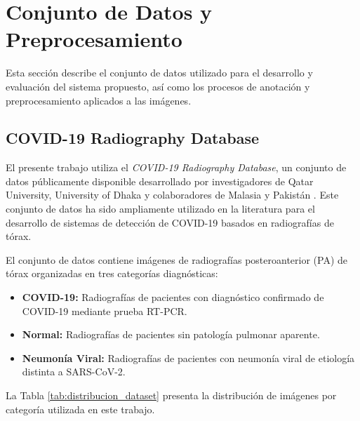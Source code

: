 
\section{Conjunto de Datos y Preprocesamiento}
\label{sec:dataset_preprocesamiento}

Esta sección describe el conjunto de datos utilizado para el desarrollo y evaluación del sistema propuesto, así como los procesos de anotación y preprocesamiento aplicados a las imágenes.

\subsection{COVID-19 Radiography Database}
\label{subsec:covid19_radiography_database}

El presente trabajo utiliza el \textit{COVID-19 Radiography Database}, un conjunto de datos públicamente disponible desarrollado por investigadores de Qatar University, University of Dhaka y colaboradores de Malasia y Pakistán \cite{chowdhury2020can, rahman2021exploring}. Este conjunto de datos ha sido ampliamente utilizado en la literatura para el desarrollo de sistemas de detección de COVID-19 basados en radiografías de tórax.

El conjunto de datos contiene imágenes de radiografías posteroanterior (PA) de tórax organizadas en tres categorías diagnósticas:

\begin{itemize}
    \item \textbf{COVID-19:} Radiografías de pacientes con diagnóstico confirmado de COVID-19 mediante prueba RT-PCR.
    \item \textbf{Normal:} Radiografías de pacientes sin patología pulmonar aparente.
    \item \textbf{Neumonía Viral:} Radiografías de pacientes con neumonía viral de etiología distinta a SARS-CoV-2.
\end{itemize}

La Tabla \ref{tab:distribucion_dataset} presenta la distribución de imágenes por categoría utilizada en este trabajo.

